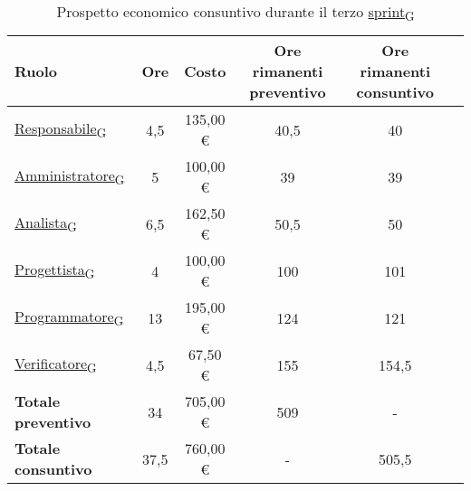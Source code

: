 \begin{table}[!h]
	\centering
	\begin{tabular}{ | l | c | c | c | c | c | }
		\hline
		\textbf{Ruolo}             & \textbf{Ore} & \textbf{Costo} & \textbf{Ore rimanenti preventivo} & \textbf{Ore rimanenti consuntivo} \\
		\hline
		\href{https://7last.github.io/docs/rtb/documentazione-interna/glossario\#responsabile}{Responsabile\textsubscript{G}}               & 4,5          & 135,00 €       & 40,5                              & 40                                \\
		\href{https://7last.github.io/docs/rtb/documentazione-interna/glossario\#amministratore}{Amministratore\textsubscript{G}}             & 5            & 100,00 €       & 39                                & 39                                \\
		\href{https://7last.github.io/docs/rtb/documentazione-interna/glossario\#analista}{Analista\textsubscript{G}}                   & 6,5          & 162,50 €       & 50,5                              & 50                                \\
		\href{https://7last.github.io/docs/rtb/documentazione-interna/glossario\#progettista}{Progettista\textsubscript{G}}                & 4            & 100,00 €       & 100                               & 101                               \\
		\href{https://7last.github.io/docs/rtb/documentazione-interna/glossario\#programmatore}{Programmatore\textsubscript{G}}              & 13           & 195,00 €       & 124                               & 121                               \\
		\href{https://7last.github.io/docs/rtb/documentazione-interna/glossario\#verificatore}{Verificatore\textsubscript{G}}               & 4,5          & 67,50 €        & 155                               & 154,5                             \\
		\hline
		\textbf{Totale preventivo} & 34           & 705,00 €       & 509                               & -                                 \\
		\hline
		\textbf{Totale consuntivo} & 37,5         & 760,00 €       & -                                 & 505,5                             \\
		\hline
	\end{tabular}
	\caption{Prospetto economico consuntivo durante il terzo \href{https://7last.github.io/docs/rtb/documentazione-interna/glossario\#sprint}{sprint\textsubscript{G}}}
	
\end{table}

